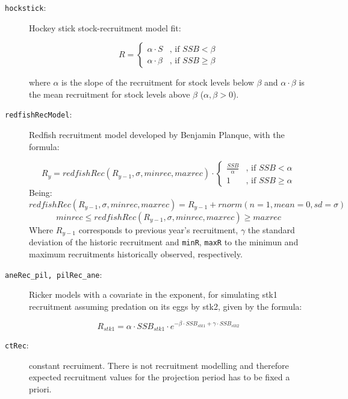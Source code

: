 	\begin{description}

		\item[\texttt{hockstick}:] Hockey stick stock-recruitment model fit:

              \[
 							R = \begin{cases}
   									\alpha\cdot S         & \text{, if } SSB < \beta \\
   									\alpha\cdot \beta     & \text{, if } SSB \geq \beta
  								\end{cases}
							\]

          where $\alpha$ is the slope of the recruitment for stock levels below
          $\beta$ and $\alpha\cdot \beta $ is the mean recruitment for stock levels above
          $\beta$ ($\alpha, \beta > 0$).

		\item[\texttt{redfishRecModel}:] Redfish recruitment model developed by Benjamin Planque, with the formula:

          \[
          R_y = redfishRec(R_{y-1},\sigma, minrec, maxrec) \cdot
            \begin{cases}
              \frac {SSB} \alpha  & \text{, if } SSB < \alpha \\
              1                   & \text{, if } SSB \geq \alpha
            \end{cases}
          \]
          Being:
            $$redfishRec(R_{y-1},\sigma, minrec, maxrec) = R_{y-1} + rnorm(n=1,mean=0,sd=\sigma)$$
            $$minrec \leq redfishRec(R_{y-1},\sigma, minrec, maxrec) \geq maxrec$$
          Where $R_{y-1}$ corresponds to previous year's recruitment, $\gamma$ the standard deviation of
          the historic recruitment and \texttt{minR}, \texttt{maxR}
          to the minimun and maximum recruitments historically observed, respectively.

    \item[\texttt{aneRec\_pil, pilRec\_ane}:] Ricker models with a covariate in the exponent, for simulating
      stk1 recruitment assuming predation on its eggs by stk2, given by the formula:

        $$R_{stk1} = \alpha\cdot SSB_{stk1} \cdot e^{-\beta \cdot SSB_{stk1} + \gamma \cdot SSB_{stk2}}$$

    \item[\texttt{ctRec}:] constant recruiment. There is not recruitment modelling and therefore expected
        recruitment values for the projection period has to be fixed a priori.

  \end{description}

